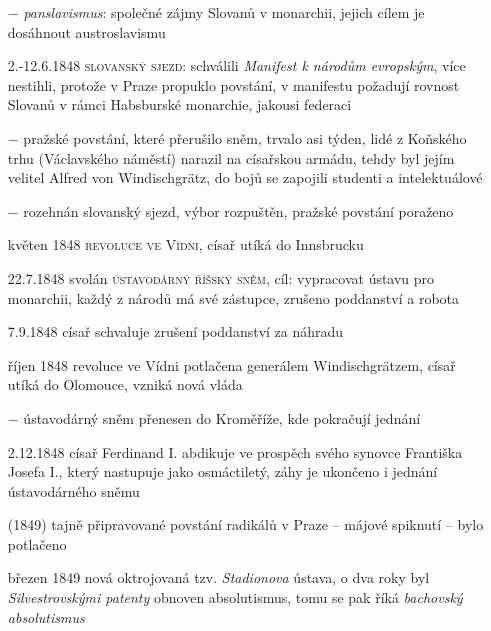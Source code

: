 \documentclass{article}
\begin{document}
\begin{itemize}
    \item[$-$] \textit{panslavismus}: společné zájmy Slovanů v monarchii, jejich cílem je dosáhnout austroslavismu
    \item[2.-12.6.1848] \textsc{slovanský sjezd}: schválili \textit{Manifest k národům evropským}, více nestihli, protože v Praze propuklo povstání, v manifestu požadují rovnost Slovanů v rámci Habsburské monarchie, jakousi federaci
    \item[$-$] pražské povstání, které přerušilo sněm, trvalo asi týden, lidé z Koňského trhu (Václavského náměstí) narazil na císařskou armádu, tehdy byl jejím velitel Alfred von Windischgrätz, do bojů se zapojili studenti a intelektuálové
    \item[$-$] rozehnán slovanský sjezd, výbor rozpuštěn, pražské povstání poraženo
    \item[květen 1848] \textsc{revoluce ve Vídni}, císař utíká do Innsbrucku
    \item[22.7.1848] svolán \textsc{ústavodárný říšský sněm}, cíl: vypracovat ústavu pro monarchii, každý z národů má své zástupce, zrušeno poddanství a robota
    \item[7.9.1848] císař schvaluje zrušení poddanství za náhradu
    \item[říjen 1848] revoluce ve Vídni potlačena generálem Windischgrätzem, císař utíká do Olomouce, vzniká nová vláda
    \item[$-$] ústavodárný sněm přenesen do Kroměříže, kde pokračují jednání
    \item[2.12.1848] císař Ferdinand I. abdikuje ve prospěch svého synovce Františka Josefa I., který nastupuje jako osmáctiletý, záhy je ukončeno i jednání ústavodárného sněmu
    \item[(1849)] tajně připravované povstání radikálů v Praze -- májové spiknutí -- bylo potlačeno
    \item[březen 1849] nová oktrojovaná tzv. \textit{Stadionova}  ústava, o dva roky byl \textit{Silvestrovskými patenty} obnoven absolutismus, tomu se pak říká \textit{bachovský absolutismus}
\end{itemize}
\end{document}
